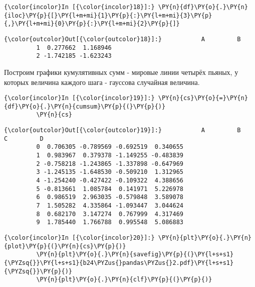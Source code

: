    \begin{Verbatim}[commandchars=\\\{\}]
{\color{incolor}In [{\color{incolor}18}]:} \PY{n}{df}\PY{o}{.}\PY{n}{iloc}\PY{p}{[}\PY{l+m+mi}{1}\PY{p}{:}\PY{l+m+mi}{3}\PY{p}{,}\PY{l+m+mi}{0}\PY{p}{:}\PY{l+m+mi}{2}\PY{p}{]}
\end{Verbatim}

            \begin{Verbatim}[commandchars=\\\{\}]
{\color{outcolor}Out[{\color{outcolor}18}]:}           A         B
         1  0.277662  1.168946
         2 -1.742185 -1.623243
\end{Verbatim}
        
    Построим графики кумулятивных сумм - мировые линии четырёх пьяных, у
которых величина каждого шага - гауссова случайная величина.

    \begin{Verbatim}[commandchars=\\\{\}]
{\color{incolor}In [{\color{incolor}19}]:} \PY{n}{cs}\PY{o}{=}\PY{n}{df}\PY{o}{.}\PY{n}{cumsum}\PY{p}{(}\PY{p}{)}
         \PY{n}{cs}
\end{Verbatim}

            \begin{Verbatim}[commandchars=\\\{\}]
{\color{outcolor}Out[{\color{outcolor}19}]:}           A         B         C         D
         0  0.706305 -0.789569 -0.692519  0.340655
         1  0.983967  0.379378 -1.149255 -0.483839
         2 -0.758218 -1.243865 -1.337898 -0.647969
         3 -1.245135 -1.648530 -0.509210  1.312965
         4 -1.254240 -0.427422 -0.109322  4.388656
         5 -0.813661  1.085784  0.141971  5.226978
         6  0.986519  2.963035 -0.579848  3.589078
         7  1.505282  4.335864 -1.093447  3.044624
         8  0.682170  3.147274  0.767999  4.317469
         9  1.785440  1.766788  0.995548  5.086883
\end{Verbatim}
        
    \begin{Verbatim}[commandchars=\\\{\}]
{\color{incolor}In [{\color{incolor}20}]:} \PY{n}{plt}\PY{o}{.}\PY{n}{plot}\PY{p}{(}\PY{n}{cs}\PY{p}{)}
         \PY{n}{plt}\PY{o}{.}\PY{n}{savefig}\PY{p}{(}\PY{l+s+s1}{\PYZsq{}}\PY{l+s+s1}{b24\PYZus{}pandas\PYZus{}2.pdf}\PY{l+s+s1}{\PYZsq{}}\PY{p}{)}
         \PY{n}{plt}\PY{o}{.}\PY{n}{clf}\PY{p}{(}\PY{p}{)}
\end{Verbatim}
